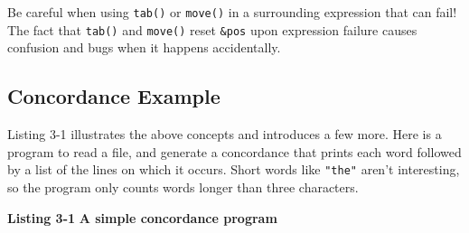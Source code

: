 Be careful when using \texttt{tab()} or \texttt{move()} in a
surrounding expression that can fail! The fact that \texttt{tab()}
and \texttt{move()} reset \texttt{\&pos} upon expression
failure causes confusion and bugs when it happens accidentally.

\subsection*{Concordance Example}

Listing 3-1 illustrates the above concepts and introduces a few more.
Here is a program to read a file, and generate a
concordance that prints each word followed by a list
of the lines on which it occurs. Short words like
\texttt{"the"} aren't
interesting, so the program only counts words longer than three
characters. 

\bigskip

{\sffamily\bfseries Listing 3-1}
{\sffamily\bfseries A simple concordance program}

